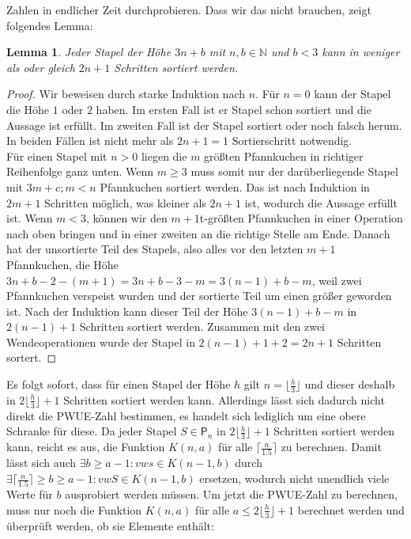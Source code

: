 \documentclass[a4paper,10pt,ngerman]{scrartcl}
\newtheorem{lemma}[theorem]{Lemma}
\begin{document}
Zahlen in endlicher Zeit durchprobieren. Dass wir das nicht brauchen, zeigt folgendes Lemma:
\begin{lemma}
  Jeder Stapel der Höhe $3n+b$ mit $n,b\in \mathbb{N}$ und $b<3$ kann in weniger als oder gleich $2n+1$ Schritten sortiert werden.
\end{lemma}
\begin{proof}
  Wir beweisen durch starke Induktion nach $n$. Für $n=0$ kann der Stapel die Höhe $1$ oder $2$ haben. Im ersten Fall ist er Stapel schon sortiert
  und die Aussage ist erfüllt. Im zweiten Fall ist der Stapel sortiert oder noch falsch herum. In beiden Fällen ist nicht mehr als $2n+1=1$ Sortierschritt
  notwendig. \\
  Für einen Stapel mit $n>0$ liegen die $m$ größten Pfannkuchen in richtiger Reihenfolge ganz unten. Wenn $m\geq3$ muss somit nur der darüberliegende Stapel mit $3m+c;m<n$ Pfannkuchen
  sortiert werden. Das ist nach Induktion in $2m+1$ Schritten möglich, was kleiner als $2n+1$ ist, wodurch die Aussage erfüllt ist. Wenn $m<3$, können wir den $m+1$t-größten Pfannkuchen
  in einer Operation nach oben bringen und in einer zweiten an die richtige Stelle am Ende. Danach hat der unsortierte Teil des Stapels, also alles vor den letzten $m+1$ Pfannkuchen,
  die Höhe $3n+b-2-(m+1)=3n+b-3-m=3(n-1)+b-m$, weil zwei Pfannkuchen verspeist wurden und der sortierte Teil um einen größer geworden ist. Nach der Induktion kann dieser Teil der Höhe
  $3(n-1)+b-m$ in $2(n-1)+1$ Schritten sortiert werden. Zusammen mit den zwei Wendeoperationen wurde der Stapel in $2(n-1)+1+2=2n+1$ Schritten sortert.
\end{proof}
Es folgt sofort, dass für einen Stapel der Höhe $h$ gilt $n=\lfloor\frac{h}{3}\rfloor$ und dieser deshalb in $2\lfloor\frac{h}{3}\rfloor+1$ Schritten sortiert werden kann.
Allerdings lässt sich dadurch nicht direkt die PWUE-Zahl bestimmen, es handelt sich lediglich um eine obere Schranke für diese.
Da jeder Stapel $S \in \mathsf{P}_n$ in $2\lfloor\frac{h}{3}\rfloor+1$ Schritten sortiert werden kann, reicht es aus,
die Funktion $K(n,a)$ für alle $\lceil \frac{n}{1.5}\rceil$ zu berechnen.
Damit lässt sich auch $\exists b \geq a-1: vws \in K(n-1,b)$ durch $\exists \lceil \frac{n}{1.5}\rceil \geq b \geq a-1: vwS \in K(n-1,b)$
ersetzen, wodurch nicht unendlich viele Werte für $b$
ausprobiert werden müssen.
Um jetzt die PWUE-Zahl zu berechnen, muss nur noch die Funktion $K(n,a)$ für alle $a \leq 2\lfloor\frac{h}{3}\rfloor+1$
berechnet werden und überprüft werden, ob sie Elemente enthält:
\end{document}
